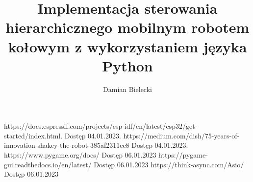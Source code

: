 \documentclass[12pt,twoside]{article}
\author{Damian Bielecki}
\title{Implementacja sterowania hierarchicznego mobilnym robotem kołowym z wykorzystaniem języka Python}
\begin{document}
\maketitle

\blankpage

\tableofcontents
\clearpage
\blankpage










	


\clearpage
	
	
\begin{thebibliography}{4}
	 https://docs.espressif.com/projects/esp-idf/en/latest/esp32/get-started/index.html. Dostęp 04.01.2023.
	 https://medium.com/dish/75-years-of-innovation-shakey-the-robot-385af2311ec8 Dostęp 04.01.2023.
	 https://www.pygame.org/docs/ Dostęp 06.01.2023
	 https://pygame-gui.readthedocs.io/en/latest/ Dostęp 06.01.2023
	 https://think-async.com/Asio/ Dostęp 06.01.2023
\end{thebibliography}
	
\clearpage
	
\makesummary
\end{document}
